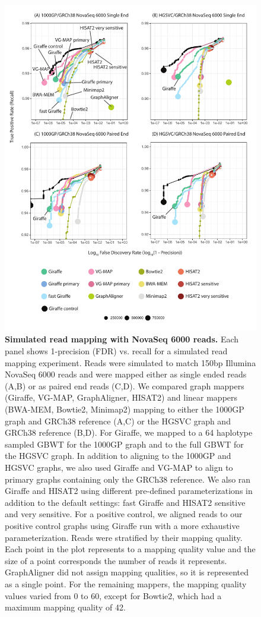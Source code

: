 \documentclass[11pt]{ucscthesis}
\begin{document}
\begin{figure}[H]
    \centering
    \includegraphics[width=.6\linewidth]{aim2_supplement_novaseq6000-all.pdf}
    \caption[Simulated read mapping with NovaSeq 6000 reads]{\textbf{Simulated read mapping with NovaSeq 6000 reads.} Each panel shows 1-precision (FDR) vs. recall for a simulated read mapping experiment. Reads were simulated to match 150bp Illumina NovaSeq 6000 reads and were mapped either as single ended reads (A,B) or as paired end reads (C,D). We compared graph mappers (Giraffe, VG-MAP, GraphAligner, HISAT2) and linear mappers (BWA-MEM, Bowtie2, Minimap2) mapping to either the 1000GP graph and GRCh38 reference (A,C) or the HGSVC graph and GRCh38 reference (B,D). For Giraffe, we mapped to a 64 haplotype sampled GBWT for the 1000GP graph and to the full GBWT for the HGSVC graph. In addition to aligning to the 1000GP and HGSVC graphs, we also used Giraffe and VG-MAP to align to primary graphs containing only the GRCh38 reference. We also ran Giraffe and HISAT2 using different pre-defined parameterizations in addition to the default settings: fast Giraffe and HISAT2 sensitive and very sensitive. For a positive control, we aligned reads to our positive control graphs using Giraffe run with a more exhaustive parameterization.
    Reads were stratified by their mapping quality. Each point in the plot represents to a mapping quality value and the size of a point corresponds the number of reads it represents. GraphAligner did not assign mapping qualities, so it is represented as a single point. For the remaining mappers, the mapping quality values varied from 0 to 60, except for Bowtie2, which had a maximum mapping quality of 42.}
    \label{fig:aim2_supplement_novaseq_rocs}
\end{figure}
\end{document}
